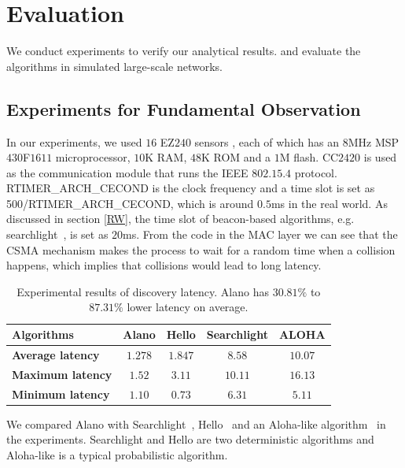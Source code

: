 \section{Evaluation}
\label{Evaluation}

We conduct experiments to verify our analytical results.
and evaluate the algorithms in simulated large-scale networks.

\subsection{Experiments for Fundamental Observation}

In our experiments, we used $16$ EZ$240$ sensors \cite{huang2012easipled}, 
each of which has an $8$MHz MSP$430$F$1611$ 
microprocessor, $10$K RAM, 
$48$K ROM and a $1$M flash. CC$2420$ is used as the communication 
module that runs the IEEE $802.15.4$ protocol.
RTIMER\_ARCH\_CECOND is the clock frequency 
and a time slot is set as 500/RTIMER\_ARCH\_CECOND,
which is around $0.5$ms in the real world. As discussed in section \ref{RW}, the time slot of beacon-based 
algorithms, e.g. searchlight~\cite{bakht2012searchlight}, is set as $20$ms.
From the code in the MAC layer we can see that the CSMA mechanism makes
the process to wait for a random time
when a collision happens, which implies that collisions would lead to
long latency.

\begin{table}[htbp]
\caption{Experimental results of discovery latency. Alano has $30.81\%$ to $ 87.31\%$ lower latency on average.}
\centering
\begin{tabular}{|l|c|c|c|c|} 
\hline
\textbf{Algorithms} & \textbf{Alano} & \textbf{Hello} & \textbf{Searchlight} & \textbf{ALOHA} \\
\hline
\textbf{Average latency} & \textbf{$1.278$} & \textbf{$1.847$} & \textbf{$8.58$} & \textbf{$10.07$} \\
\hline
\textbf{Maximum latency} & \textbf{$1.52$} & \textbf{$3.11$} & \textbf{$10.11$} & \textbf{$16.13$} \\
\hline
\textbf{Minimum latency} & \textbf{$1.10$} & \textbf{$0.73$} & \textbf{$6.31$} & \textbf{$5.11$} \\
\hline
\end{tabular}
\label{Exp}
\end{table}

We compared Alano with Searchlight~\cite{bakht2012searchlight}, 
Hello~\cite{sun2014hello} and an Aloha-like algorithm~\cite{you2011aloha} 
in the experiments. Searchlight and Hello are two deterministic algorithms
and Aloha-like is a typical probabilistic algorithm.

